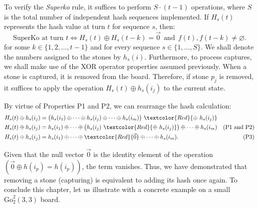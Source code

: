 To verify the \textit{Superko} rule, it suffices to perform \(S \cdot (t-1)\) operations, where \(S\) is the total number of independent hash sequences implemented. If \(H_{s}(t)\) represents the hash value at turn \(t\) for sequence \(s\), then:
$$ \text{SuperKo at turn } t \iff H_{s}(t) \oplus H_{s}(t-k) = \vec{0}\ \ \text{and}\ \  f(t),f(t-k)\neq \varnothing.$$
for some $k \in \{1, 2, \dots, t-1\}$ and for every sequence $s \in \{1, \dots, S\}$. We shall denote the numbers assigned to the stones by $h_s(i)$. Furthermore, to process captures, we shall make use of the XOR operator properties assumed previously. When a stone is captured, it is removed from the board. Therefore, if stone $p_{j}$ is removed, it suffices to apply the operation $H_s(t) \oplus h_s(i_{j})$ to the current state.

By virtue of Properties P1 and P2, we can rearrange the hash calculation:
\begin{align*}
	H_s(t) \oplus h_s(i_{j}) &= \big( h_s(i_{1}) \oplus \dots \oplus h_s(i_{j}) \oplus \dots \oplus h_s(i_{m}) \big) \ \textcolor{Red}{\oplus \ h_s(i_{j})} \\
	H_s(t) \oplus h_s(i_{j}) &= h_s(i_{1}) \oplus \dots \oplus \big( h_s(i_{j}) \ \textcolor{Red}{\oplus \ h_s(i_{j})} \big) \oplus \dots \oplus h_s(i_{m}) & \text{(P1 and P2)} \\
	H_s(t) \oplus h_s(i_{j}) &= h_s(i_{1}) \oplus \dots \oplus \textcolor{Red}{\vec{0}} \oplus \dots \oplus h_s(i_{m}). & \text{(P3)}
\end{align*}

Given that the null vector \(\vec{0}\) is the identity element of the operation \((\vec{0}\oplus h(i_{p})=h(i_{p}))\), the term vanishes. Thus, we have demonstrated that removing a stone (capturing) is equivalent to adding its hash once again. To conclude this chapter, let us illustrate with a concrete example on a small \(\mathrm{Go}^{2}_{2}(3,3)\) board.


